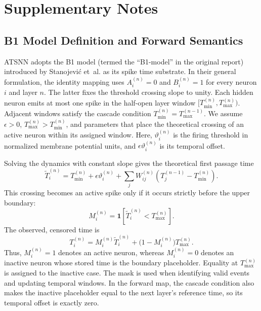 \documentclass[12pt]{article}
\begin{document}
\section{Supplementary Notes}

\subsection{B1 Model Definition and Forward Semantics}

ATSNN adopts the B1 model (termed the ``B1-model'' in the original report) introduced by Stanojevi\'{c} et~al. \cite{ref46} as its spike time substrate. In their general formulation, the identity mapping uses $A_i^{(n)}=0$ and $B_i^{(n)}=1$ for every neuron $i$ and layer $n$. The latter fixes the threshold crossing slope to unity. Each hidden neuron emits at most one spike in the half-open layer window $[T_{\min}^{(n)},T_{\max}^{(n)})$. Adjacent windows satisfy the cascade condition $T_{\min}^{(n)}=T_{\max}^{(n-1)}$. We assume $\epsilon>0$, $T_{\max}^{(n)}>T_{\min}^{(n)}$, and parameters that place the theoretical crossing of an active neuron within its assigned window. Here, $\vartheta_i^{(n)}$ is the firing threshold in normalized membrane potential units, and $\epsilon\vartheta_i^{(n)}$ is its temporal offset.

Solving the dynamics with constant slope gives the theoretical first passage time
\begin{equation}
\tilde{T}_i^{(n)} = T_{\min}^{(n)} + \epsilon\vartheta_i^{(n)} + \sum_j W_{ij}^{(n)}\!\left(T_j^{(n-1)} - T_{\min}^{(n)}\right).
\label{eq:supp_theoretical_time}
\end{equation}
This crossing becomes an active spike only if it occurs strictly before the upper boundary:
\begin{equation}
M_i^{(n)} = \mathbf{1}\!\left[\tilde{T}_i^{(n)} < T_{\max}^{(n)}\right].
\label{eq:b1_mask}
\end{equation}
The observed, censored time is
\begin{equation}
T_i^{(n)} = M_i^{(n)}\tilde{T}_i^{(n)} + \bigl(1-M_i^{(n)}\bigr)T_{\max}^{(n)}.
\label{eq:supp_actual_time}
\end{equation}
Thus, $M_i^{(n)}=1$ denotes an active neuron, whereas $M_i^{(n)}=0$ denotes an inactive neuron whose stored time is the boundary placeholder. Equality at $T_{\max}^{(n)}$ is assigned to the inactive case. The mask is used when identifying valid events and updating temporal windows. In the forward map, the cascade condition also makes the inactive placeholder equal to the next layer's reference time, so its temporal offset is exactly zero.
\end{document}
